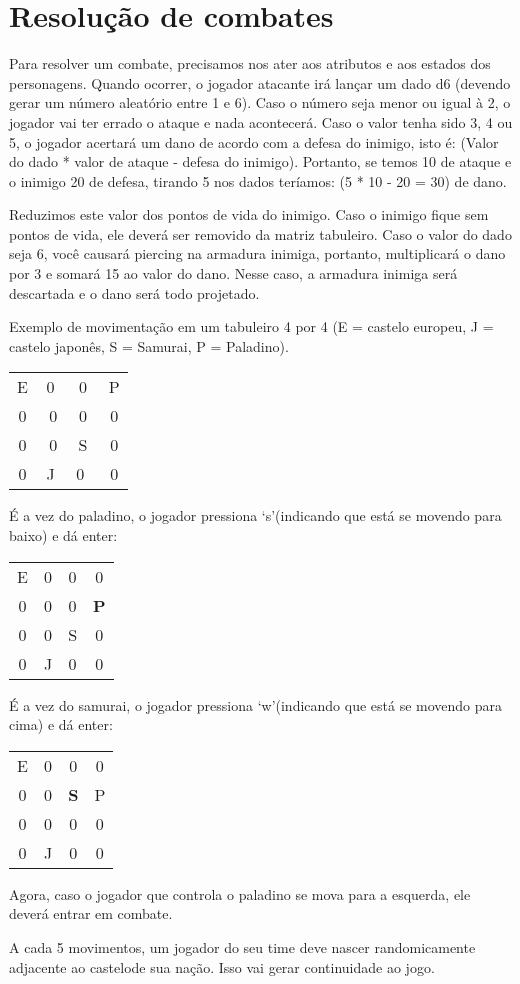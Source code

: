 \documentclass{article}
\begin{document}
\section*{Resolução de combates}
Para resolver um combate, precisamos nos ater aos atributos e aos estados dos personagens. Quando ocorrer, o jogador atacante irá lançar um dado d6 (devendo gerar um número aleatório entre 1 e 6). Caso o número seja menor ou igual à 2, o jogador vai ter errado o ataque e nada acontecerá. Caso o valor tenha sido 3, 4 ou 5, o jogador acertará um dano de acordo com a
defesa do inimigo, isto é: (Valor do dado * valor de ataque - defesa do
inimigo). Portanto, se temos 10 de ataque e o inimigo 20 de defesa, tirando 5 nos dados teríamos: (5 * 10 - 20 = 30) de dano.
\par Reduzimos este valor dos pontos de vida do inimigo. Caso o inimigo fique sem pontos de vida, ele deverá ser removido da matriz tabuleiro. Caso o valor do dado seja 6, você causará piercing na armadura inimiga, portanto, multiplicará o dano por 3 e somará 15 ao valor do dano. Nesse caso, a armadura inimiga​ será descartada​  e​ o​ dano​ será​ todo projetado.
\par Exemplo de movimentação em um tabuleiro 4 por 4 (E = castelo europeu, J = castelo japonês,​ S​ =​ Samurai, P =​ Paladino).
\begin{tabular}{c c c c}
	E & 0 &​ 0 &​ P \\
	0 &​ 0 &​ 0 &​ 0 \\
	0 &​ 0 &​ S &​ 0 \\
	0​ & J & 0 &​ 0
\end{tabular}
\par É a​ vez​ do paladino,​ o​ jogador pressiona​ ‘s’​​(indicando que está se movendo para baixo) e dá enter:
\begin{tabular}{c c c c}
	E & 0 & 0 & 0 \\
	0 & 0 & 0 & \textbf{P} \\
	0 & 0 & S & 0 \\
	0 & J & 0 & 0
\end{tabular}
\par É a​ vez​ do samurai,​ o​ jogador​ pressiona​ ‘w’​(indicando que está se movendo para cima) e dá enter:
\begin{tabular}{c c c c}
	E & 0 & 0 & 0 \\
	0 & 0 & \textbf{S} & P \\
	0 & 0 & 0 & 0 \\
	0 & J & 0 & 0
\end{tabular}
\par Agora, caso o jogador que controla o paladino se mova para a esquerda, ele deverá entrar em combate.
\par A cada 5 movimentos, um jogador do seu time deve nascer randomicamente
adjacente ao castelo​de​ sua nação.​ Isso vai gerar continuidade​ ao jogo.
\end{document}
